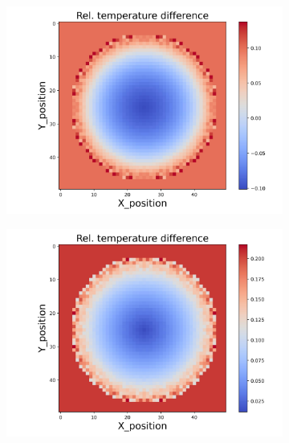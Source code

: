 \begin{figure}[h]
    \begin{minipage}{\textwidth}
        \centering
        \begin{subfigure}{0.325\textwidth}
            \centering
            \includegraphics[width=\textwidth]{figures/raw_data/25/exp/T_bias.jpg}
        \end{subfigure}
        \begin{subfigure}{0.325\textwidth}
            \centering
            \includegraphics[width=\textwidth]{figures/raw_data/26/exp/T_bias.jpg}
        \end{subfigure}
        \begin{subfigure}{0.325\textwidth}

\end{subfigure}
\end{minipage}
\end{figure}
